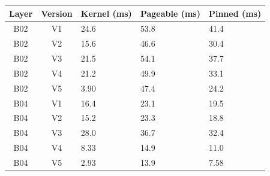\begin{tabular}{cclll}
\hline
\rowcolor{headgrey}
\textbf{Layer} & \textbf{Version} & \textbf{Kernel (ms)} & \textbf{Pageable (ms)} & \textbf{Pinned (ms)} \\ \hline
B02 & V1 & 24.6 & 53.8 & 41.4 \\
B02 & V2 & 15.6 & 46.6 & 30.4 \\
B02 & V3 & 21.5 & 54.1 & 37.7 \\
B02 & V4 & 21.2 & 49.9 & 33.1 \\
B02 & V5 & 3.90 & 47.4 & 24.2 \\
B04 & V1 & 16.4 & 23.1 & 19.5 \\
B04 & V2 & 15.2 & 23.3 & 18.8 \\
B04 & V3 & 28.0 & 36.7 & 32.4 \\
B04 & V4 & 8.33 & 14.9 & 11.0 \\
B04 & V5 & 2.93 & 13.9 & 7.58 \\
\hline
\end{tabular}
